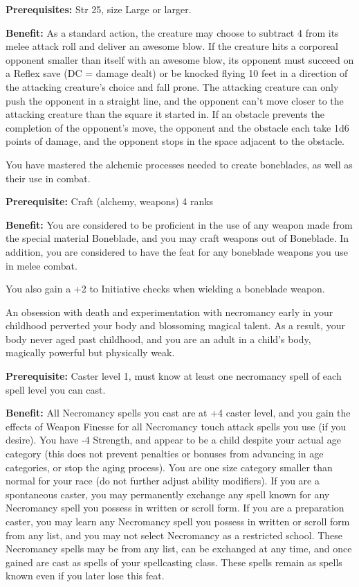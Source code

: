 
\textbf{Prerequisites:} Str 25, size Large or larger.

\textbf{Benefit:} As a standard action, the creature may choose to subtract 4 from its melee attack roll and deliver an awesome blow. If the creature hits a corporeal opponent smaller than itself with an awesome blow, its opponent must succeed on a Reflex save (DC = damage dealt) or be knocked flying 10 feet in a direction of the attacking creature's choice and fall prone. The attacking creature can only push the opponent in a straight line, and the opponent can't move closer to the attacking creature than the square it started in. If an obstacle prevents the completion of the opponent's move, the opponent and the obstacle each take 1d6 points of damage, and the opponent stops in the space adjacent to the obstacle.


You have mastered the alchemic processes needed to create boneblades, as well as their use in combat.

\textbf{Prerequisite:} Craft (alchemy, weapons) 4 ranks

\textbf{Benefit:} You are considered to be proficient in the use of any weapon made from the special material Boneblade, and you may craft weapons out of Boneblade. In addition, you are considered to have the  feat for any boneblade weapons you use in melee combat.

You also gain a +2 to Initiative checks when wielding a boneblade weapon.


An obsession with death and experimentation with necromancy early in your childhood perverted your body and blossoming magical talent. As a result, your body never aged past childhood, and you are an adult in a child's body, magically powerful but physically weak.

\textbf{Prerequisite:} Caster level 1, must know at least one necromancy spell of each spell level you can cast.

\textbf{Benefit:} All Necromancy spells you cast are at +4 caster level, and you gain the effects of Weapon Finesse for all Necromancy touch attack spells you use (if you desire). You have -4 Strength, and appear to be a child despite your actual age category (this does not prevent penalties or bonuses from advancing in age categories, or stop the aging process). You are one size category smaller than normal for your race (do not further adjust ability modifiers). If you are a spontaneous caster, you may permanently exchange any spell known for any Necromancy spell you possess in written or scroll form. If you are a preparation caster, you may learn any Necromancy spell you possess in written or scroll form from any list, and you may not select Necromancy as a restricted school. These Necromancy spells may be from any list, can be exchanged at any time, and once gained are cast as spells of your spellcasting class. These spells remain as spells known even if you later lose this feat.

